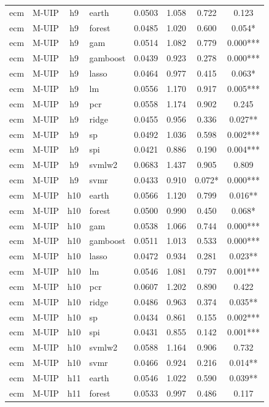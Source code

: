 \begin{ThreePartTable}
\begin{longtable}[t]{llclcccc}
\addlinespace
ecm & M-UIP & h9 & earth & 0.0503 & 1.058 & 0.722 & 0.123\\
ecm & M-UIP & h9 & forest & 0.0485 & 1.020 & 0.600 & 0.054*\\
ecm & M-UIP & h9 & gam & 0.0514 & 1.082 & 0.779 & 0.000***\\
ecm & M-UIP & h9 & gamboost & 0.0439 & 0.923 & 0.278 & 0.000***\\
ecm & M-UIP & h9 & lasso & 0.0464 & 0.977 & 0.415 & 0.063*\\
ecm & M-UIP & h9 & lm & 0.0556 & 1.170 & 0.917 & 0.005***\\
ecm & M-UIP & h9 & pcr & 0.0558 & 1.174 & 0.902 & 0.245\\
ecm & M-UIP & h9 & ridge & 0.0455 & 0.956 & 0.336 & 0.027**\\
ecm & M-UIP & h9 & sp & 0.0492 & 1.036 & 0.598 & 0.002***\\
ecm & M-UIP & h9 & spi & 0.0421 & 0.886 & 0.190 & 0.004***\\
ecm & M-UIP & h9 & svmlw2 & 0.0683 & 1.437 & 0.905 & 0.809\\
ecm & M-UIP & h9 & svmr & 0.0433 & 0.910 & 0.072* & 0.000***\\
\addlinespace
ecm & M-UIP & h10 & earth & 0.0566 & 1.120 & 0.799 & 0.016**\\
ecm & M-UIP & h10 & forest & 0.0500 & 0.990 & 0.450 & 0.068*\\
ecm & M-UIP & h10 & gam & 0.0538 & 1.066 & 0.744 & 0.000***\\
ecm & M-UIP & h10 & gamboost & 0.0511 & 1.013 & 0.533 & 0.000***\\
ecm & M-UIP & h10 & lasso & 0.0472 & 0.934 & 0.281 & 0.023**\\
ecm & M-UIP & h10 & lm & 0.0546 & 1.081 & 0.797 & 0.001***\\
ecm & M-UIP & h10 & pcr & 0.0607 & 1.202 & 0.890 & 0.422\\
ecm & M-UIP & h10 & ridge & 0.0486 & 0.963 & 0.374 & 0.035**\\
ecm & M-UIP & h10 & sp & 0.0434 & 0.861 & 0.155 & 0.002***\\
ecm & M-UIP & h10 & spi & 0.0431 & 0.855 & 0.142 & 0.001***\\
ecm & M-UIP & h10 & svmlw2 & 0.0588 & 1.164 & 0.906 & 0.732\\
ecm & M-UIP & h10 & svmr & 0.0466 & 0.924 & 0.216 & 0.014**\\
\addlinespace
ecm & M-UIP & h11 & earth & 0.0546 & 1.022 & 0.590 & 0.039**\\
ecm & M-UIP & h11 & forest & 0.0533 & 0.997 & 0.486 & 0.117\\

\end{longtable}
\end{ThreePartTable}
